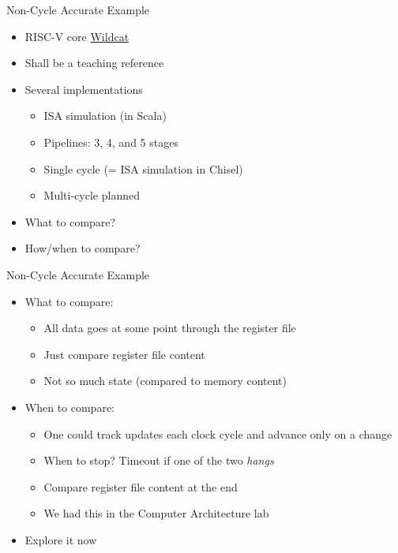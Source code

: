 \begin{frame}[fragile]{Non-Cycle Accurate Example}
\begin{itemize}
\item RISC-V core \href{https://github.com/schoeberl/wildcat}{Wildcat}
\item Shall be a teaching reference
\item Several implementations
\begin{itemize}
\item ISA simulation (in Scala)
\item Pipelines: 3, 4, and 5 stages
\item Single cycle (= ISA simulation in Chisel)
\item Multi-cycle planned
\end{itemize}
\item What to compare?
\item How/when to compare?
\end{itemize}
\end{frame}

\begin{frame}[fragile]{Non-Cycle Accurate Example}
\begin{itemize}
\item What to compare:
\begin{itemize}
\item All data goes at some point through the register file
\item Just compare register file content
\item Not so much state (compared to memory content)
\end{itemize}
\item When to compare:
\begin{itemize}
\item One could track updates each clock cycle and advance only on a change
\item When to stop? Timeout if one of the two \emph{hangs}
\item Compare register file content at the end
\item We had this in the Computer Architecture lab
\end{itemize}
\item Explore it now
\end{itemize}
\end{frame}

